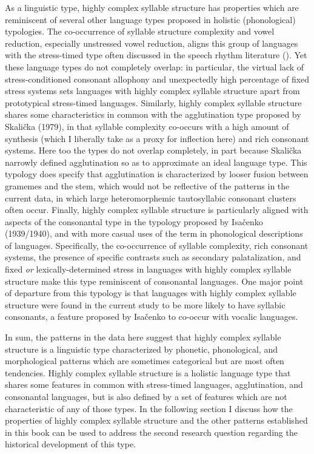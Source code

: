   As a linguistic type, highly complex syllable structure has properties which are reminiscent of several other language types proposed in holistic (phonological) typologies. The co-occurrence of syllable structure complexity and vowel reduction, especially unstressed vowel reduction, aligns this group of languages with the stress-timed type often discussed in the speech rhythm literature (\citealt{Dauer1983,Auer1993,Schiering2007}). Yet these language types do not completely overlap: in particular, the virtual lack of stress-conditioned consonant allophony and unexpectedly high percentage of fixed stress systems sets languages with highly complex syllable structure apart from prototypical stress-timed languages. Similarly, highly complex syllable structure shares some characteristics in common with the agglutination type proposed by Skalička (1979), in that syllable complexity co-occurs with a high amount of synthesis (which I liberally take as a proxy for inflection here) and rich consonant systems. Here too the types do not overlap completely, in part because Skalička narrowly defined agglutination so as to approximate an ideal language type. This typology does specify that agglutination is characterized by looser fusion between gramemes and the stem, which would not be reflective of the patterns in the current data, in which large heteromorphemic tautosyllabic consonant clusters often occur. Finally, highly complex syllable structure is particularly aligned with aspects of the consonantal type in the typology proposed by Isačenko (1939/1940), and with more casual uses of the term in phonological descriptions of languages. Specifically, the co-occurrence of syllable complexity, rich consonant systems, the presence of specific contrasts such as secondary palatalization, and fixed \textit{or} lexically-determined stress in languages with highly complex syllable structure make this type reminiscent of consonantal languages. One major point of departure from this typology is that languages with highly complex syllable structure were found in the current study to be more likely to have syllabic consonants, a feature proposed by Isačenko to co-occur with vocalic languages.

  In sum, the patterns in the data here suggest that highly complex syllable structure is a linguistic type characterized by phonetic, phonological, and morphological patterns which are sometimes categorical but are most often tendencies. Highly complex syllable structure is a holistic language type that shares some features in common with stress-timed languages, agglutination, and consonantal languages, but is also defined by a set of features which are not characteristic of any of those types. In the following section I discuss how the properties of highly complex syllable structure and the other patterns established in this book can be used to address the second research question regarding the historical development of this type.


